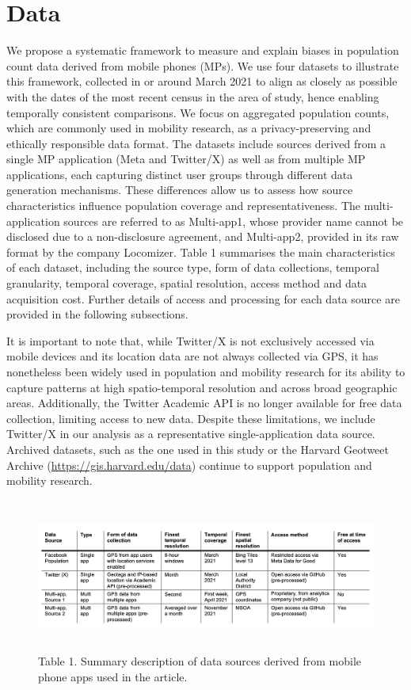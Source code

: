 \documentclass[]{rsos}%
\begin{document}
\section{Data}\label{data}

We propose a systematic framework to measure and explain biases in
population count data derived from mobile phones (MPs). We use four
datasets to illustrate this framework, collected in or around March 2021
to align as closely as possible with the dates of the most recent census
in the area of study, hence enabling temporally consistent comparisons.
We focus on aggregated population counts, which are commonly used in
mobility research, as a privacy-preserving and ethically responsible
data format. The datasets include sources derived from a single MP
application (Meta and Twitter/X) as well as from multiple MP
applications, each capturing distinct user groups through different data
generation mechanisms. These differences allow us to assess how source
characteristics influence population coverage and representativeness.
The multi-application sources are referred to as Multi-app1, whose
provider name cannot be disclosed due to a non-disclosure agreement, and
Multi-app2, provided in its raw format by the company Locomizer. Table 1
summarises the main characteristics of each dataset, including the
source type, form of data collections, temporal granularity, temporal
coverage, spatial resolution, access method and data acquisition cost.
Further details of access and processing for each data source are
provided in the following subsections.

It is important to note that, while Twitter/X is not exclusively
accessed via mobile devices and its location data are not always
collected via GPS, it has nonetheless been widely used in population and
mobility research for its ability to capture patterns at high
spatio-temporal resolution and across broad geographic areas.
Additionally, the Twitter Academic API is no longer available for free
data collection, limiting access to new data. Despite these limitations,
we include Twitter/X in our analysis as a representative
single-application data source. Archived datasets, such as the one used
in this study or the Harvard Geotweet Archive
(\url{https://gis.harvard.edu/data}) continue to support population and
mobility research.

\begin{figure}
\centering
\includegraphics[width=5.20833in,height=1.97917in]{figures/table-data-source.png}
\caption{Table 1. Summary description of data sources derived from mobile phone
apps used in the article.}
\end{figure}
\end{document}
